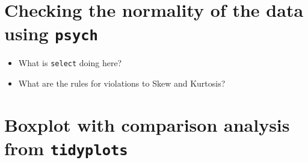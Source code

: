 \documentclass[
]{article}
\newenvironment{Shaded}{\begin{snugshade}}{\end{snugshade}}
\newcommand{\AttributeTok}[1]{\textcolor[rgb]{0.13,0.29,0.53}{#1}}
\newcommand{\CommentTok}[1]{\textcolor[rgb]{0.56,0.35,0.01}{\textit{#1}}}
\newcommand{\ConstantTok}[1]{\textcolor[rgb]{0.56,0.35,0.01}{#1}}
\newcommand{\DecValTok}[1]{\textcolor[rgb]{0.00,0.00,0.81}{#1}}
\newcommand{\FunctionTok}[1]{\textcolor[rgb]{0.13,0.29,0.53}{\textbf{#1}}}
\newcommand{\NormalTok}[1]{#1}
\newcommand{\SpecialCharTok}[1]{\textcolor[rgb]{0.81,0.36,0.00}{\textbf{#1}}}
\providecommand{\tightlist}{%
  \setlength{\itemsep}{0pt}\setlength{\parskip}{0pt}}
\begin{document}
\hypertarget{checking-the-normality-of-the-data-using-psych}{%
\section{\texorpdfstring{Checking the normality of the data using
\texttt{psych}}{Checking the normality of the data using psych}}\label{checking-the-normality-of-the-data-using-psych}}

\begin{Shaded}
\end{Shaded}

\begin{itemize}
\tightlist
\item
  What is \texttt{select} doing here?
\item
  What are the rules for violations to Skew and Kurtosis?
\end{itemize}

\hypertarget{boxplot-with-comparison-analysis-from-tidyplots}{%
\section{\texorpdfstring{Boxplot with comparison analysis from
\texttt{tidyplots}}{Boxplot with comparison analysis from tidyplots}}\label{boxplot-with-comparison-analysis-from-tidyplots}}
\end{document}
